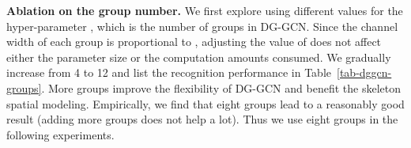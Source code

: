 \begin{table*}[t]
	\centering
	\captionsetup{font=small}
	\captionsetup[subfloat]{font=small, position=bottom}
\caption{\small \textbf{Ablation study on different choices for DG-GCN design.}}
    \vspace{1mm}
	\label{tab-dggcn}
    \vspace{-13mm}
\end{table*}

\noindent
\textbf{Ablation on the group number. }
We first explore using different values for the hyper-parameter , which is the number of groups in DG-GCN.
Since the channel width of each group is proportional to , adjusting the value of  does not affect either the parameter size or the computation amounts consumed.
We gradually increase  from 4 to 12 and list the recognition performance in Table~\ref{tab-dggcn-groups}. 
More groups improve the flexibility of DG-GCN and benefit the skeleton spatial modeling. 
Empirically, we find that eight groups lead to a reasonably good result (adding more groups does not help a lot).
Thus we use eight groups in the following experiments. 

